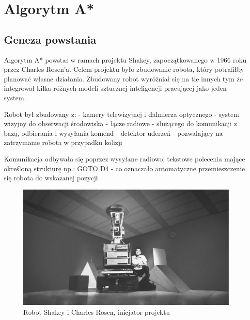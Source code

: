 \section{Algorytm A*}
\subsection{Geneza powstania}
Algorytm A* powstał w ramach projektu Shakey, zapoczątkowanego w 1966 roku przez Charles Rosen'a.
Celem projektu było zbudowanie robota, który potrafiłby planować własne działania. 
Zbudowany robot wyróżniał się na tle innych tym że integrował kilka różnych modeli sztucznej 
inteligencji pracującej jako jeden system.

Robot był zbudowany z:
- kamery telewizyjnej i dalmierza optycznego - system wizyjny do obserwacji środowiska
- łącze radiowe - służącego do komunikacji z bazą, odbierania i wysyłania komend
- detektor uderzeń - pozwalający na zatrzymanie robota w przypadku kolizji

Komunikacja odbywała się poprzez wysyłane radiowo, tekstowe polecenia mające określoną strukturę np.:
GOTO D4 - co oznaczało automatyczne przemieszczenie się robota do wskazanej pozycji
\begin{figure}[H]
	\centering
	\includegraphics[width=14cm]{pages/algorytm/zdjecia/shakey2.jpg}
	\caption{Robot Shakey i Charles Rosen, inicjator projektu \cite{robotShakey}}
	\label{fig:Rys}
\end{figure}


